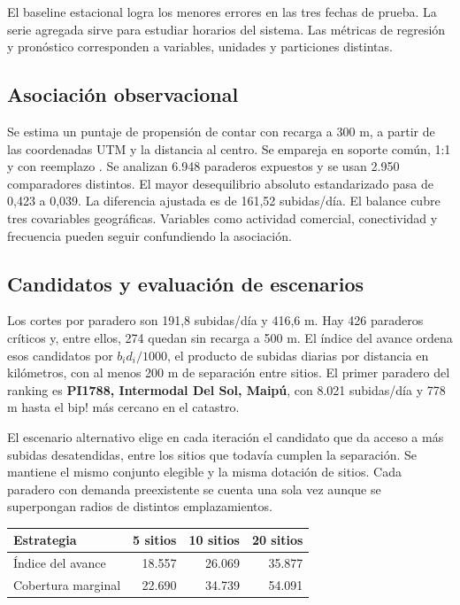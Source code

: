 \documentclass[11pt,a4paper]{article}
\begin{document}
El baseline estacional logra los menores errores en las tres fechas de prueba. La serie agregada sirve para estudiar horarios del sistema. Las métricas de regresión y pronóstico corresponden a variables, unidades y particiones distintas.

\subsection{Asociación observacional}

Se estima un puntaje de propensión de contar con recarga a 300 m, a partir de las coordenadas UTM y la distancia al centro. Se empareja en soporte común, 1:1 y con reemplazo \cite{rosenbaum}. Se analizan 6.948 paraderos expuestos y se usan 2.950 comparadores distintos. El mayor desequilibrio absoluto estandarizado pasa de 0,423 a 0,039. La diferencia ajustada es de 161,52 subidas/día. El balance cubre tres covariables geográficas. Variables como actividad comercial, conectividad y frecuencia pueden seguir confundiendo la asociación.

\subsection{Candidatos y evaluación de escenarios}

Los cortes por paradero son 191,8 subidas/día y 416,6 m. Hay 426 paraderos críticos y, entre ellos, 274 quedan sin recarga a 500 m. El índice del avance ordena esos candidatos por $b_i d_i/1000$, el producto de subidas diarias por distancia en kilómetros, con al menos 200 m de separación entre sitios. El primer paradero del ranking es \textbf{PI1788, Intermodal Del Sol, Maipú}, con 8.021 subidas/día y 778 m hasta el bip! más cercano en el catastro.

El escenario alternativo elige en cada iteración el candidato que da acceso a más subidas desatendidas, entre los sitios que todavía cumplen la separación. Se mantiene el mismo conjunto elegible y la misma dotación de sitios. Cada paradero con demanda preexistente se cuenta una sola vez aunque se superpongan radios de distintos emplazamientos.

\begin{tabularx}{\linewidth}{@{}X r r r@{}}
\toprule
\textbf{Estrategia} & \textbf{5 sitios} & \textbf{10 sitios} & \textbf{20 sitios} \\
\midrule
Índice del avance & 18.557 & 26.069 & 35.877 \\
Cobertura marginal & 22.690 & 34.739 & 54.091 \\
\bottomrule
\end{tabularx}
\end{document}
